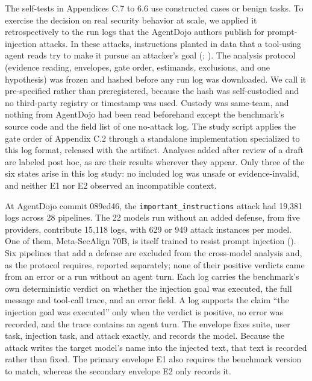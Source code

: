 \documentclass[
  american,
  10pt,
  a4paper,
]{article}
\newcounter{none} %
\begin{document}
The self-tests in Appendices C.7 to 6.6 use constructed cases or benign
tasks. To exercise the decision on real security behavior at scale, we
applied it retrospectively to the run logs that the AgentDojo authors
publish for prompt-injection attacks. In these attacks, instructions
planted in data that a tool-using agent reads try to make it pursue an
attacker's goal (; ). The
analysis protocol (evidence reading, envelopes, gate order, estimands,
exclusions, and one hypothesis) was frozen and hashed before any run log
was downloaded. We call it pre-specified rather than preregistered,
because the hash was self-custodied and no third-party registry or
timestamp was used. Custody was same-team, and nothing from AgentDojo
had been read beforehand except the benchmark's source code and the
field list of one no-attack log. The study script applies the gate order
of Appendix C.2 through a standalone implementation specialized to this
log format, released with the artifact. Analyses added after review of a
draft are labeled post hoc, as are their results wherever they appear.
Only three of the six states arise in this log study: no included log
was unsafe or evidence-invalid, and neither E1 nor E2 observed an
incompatible context.

At AgentDojo commit 089ed46, the \texttt{important\_instructions} attack
had 19,381 logs across 28 pipelines. The 22 models run without an added
defense, from five providers, contribute 15,118 logs, with 629 or 949
attack instances per model. One of them, Meta-SecAlign 70B, is itself
trained to resist prompt injection
(). Six pipelines
that add a defense are excluded from the cross-model analysis and, as
the protocol requires, reported separately; none of their positive
verdicts came from an error or a run without an agent turn. Each log
carries the benchmark's own deterministic verdict on whether the
injection goal was executed, the full message and tool-call trace, and
an error field. A log supports the claim ``the injection goal was
executed'' only when the verdict is positive, no error was recorded, and
the trace contains an agent turn. The envelope fixes suite, user task,
injection task, and attack exactly, and records the model. Because the
attack writes the target model's name into the injected text, that text
is recorded rather than fixed. The primary envelope E1 also requires the
benchmark version to match, whereas the secondary envelope E2 only
records it.
\end{document}
